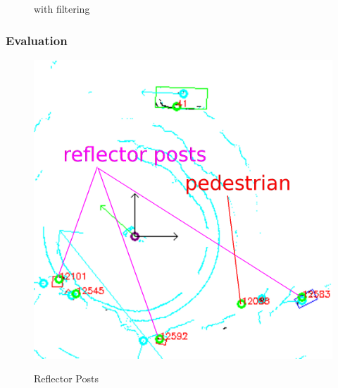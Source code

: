\documentclass[nosymbols]{beamer}	%
\begin{document}
\begin{frame}
\begin{figure}[htb]
\begin{minipage}[t]{0.49\textwidth}
	with filtering
    \end{minipage}
    \label{conf_filter}
\end{figure}
\end{frame}




\begin{frame}
\frametitle{Evaluation}
\begin{figure}[!ht]
\begin{center}
\caption{Reflector Posts }
\includegraphics[width=\textwidth,height=0.7\textheight,keepaspectratio]{bilder/reflector_posts.png}
\label{obst_cases}
\end{center}
\end{figure}
\end{frame}
\end{document}
